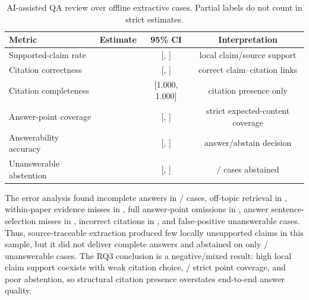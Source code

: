 \begin{table}[htbp]
\centering
\caption{AI-assisted QA review over \QaCaseCount{} offline extractive cases. Partial labels do not count in strict estimates.}
\label{tab:qa-results}
\begin{tabularx}{\textwidth}{Yccc}
\toprule
Metric & Estimate & 95\% CI & Interpretation \\
\midrule
Supported-claim rate & \QaSupportedClaimRate{} & [\QaSupportedClaimRateLow{}, \QaSupportedClaimRateHigh{}] & local claim/source support \\
Citation correctness & \QaCitationCorrectness{} & [\QaCitationCorrectnessLow{}, \QaCitationCorrectnessHigh{}] & correct claim--citation links \\
Citation completeness & \QaCitationCompleteness{} & [1.000, 1.000] & citation presence only \\
Answer-point coverage & \QaAnswerPointCoverage{} & [\QaAnswerPointCoverageLow{}, \QaAnswerPointCoverageHigh{}] & strict expected-content coverage \\
Answerability accuracy & \QaAbstentionAccuracy{} & [\QaAbstentionAccuracyLow{}, \QaAbstentionAccuracyHigh{}] & answer/abstain decision \\
Unanswerable abstention & \QaUnanswerableAbstentionRate{} & [\QaUnanswerableAbstentionRateLow{}, \QaUnanswerableAbstentionRateHigh{}] & \QaUnanswerableAbstentionCount{}/\QaUnanswerableCaseCount{} cases abstained \\
\bottomrule
\end{tabularx}
\end{table}

The error analysis found incomplete answers in \QaIncompleteCaseCount{}/\QaCaseCount{} cases, off-topic retrieval in \QaOffTopicRetrievalCaseCount{}, within-paper evidence misses in \QaWithinPaperMissCaseCount{}, full answer-point omissions in \QaAnswerPointOmissionCaseCount{}, answer sentence-selection misses in \QaSentenceSelectionMissCaseCount{}, incorrect citations in \QaIncorrectCitationCaseCount{}, and \QaFalsePositiveCaseCount{} false-positive unanswerable cases. Thus, source-traceable extraction produced few locally unsupported claims in this sample, but it did not deliver complete answers and abstained on only \QaUnanswerableAbstentionCount{}/\QaUnanswerableCaseCount{} unanswerable cases. The RQ3 conclusion is a negative/mixed result: high local claim support coexists with weak citation choice, \QaCoveredAnswerPointCount{}/\QaAnswerPointCount{} strict point coverage, and poor abstention, so structural citation presence overstates end-to-end answer quality.

